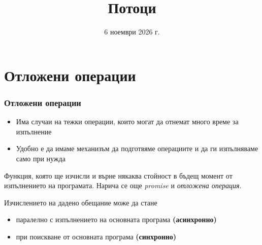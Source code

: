 \documentclass[alsotrans,beameroptions={aspectratio=169}]{beamerswitch}
\title{Потоци}
\date{6 ноември 2026 г.}
\begin{document}
\begin{frame}
  \titlepage
\end{frame}

\section{Отложени операции}

\begin{frame}
  \frametitle{Отложени операции}

  \begin{itemize}[<+->]
  \item Има случаи на тежки операции, които могат да отнемат много време за изпълнение
  \item Удобно е да имаме механизъм да \alert{подготвяме} операциите и да ги \alert{изпълняваме} само при нужда
  \end{itemize}
  \onslide<+->
  \begin{definition}[Обещание]
    Функция, която ще изчисли и върне някаква стойност в бъдещ момент от изпълнението на програмата.
    \onslide<+->
    Нарича се още \emph{promise} и \emph{отложена операция}.
  \end{definition}
  \onslide<+->
  Изчислението на дадено обещание може да стане
  \begin{itemize}[<+->]
  \item паралелно с изпълнението на основната програма \textbf{(асинхронно)}
  \item при поискване от основната програма \textbf{(синхронно)}
  \end{itemize}
\end{frame}
\end{document}
